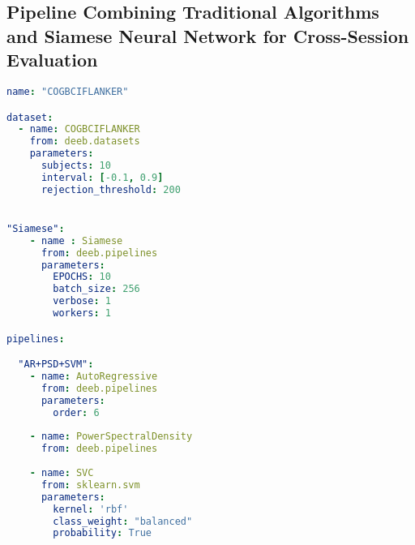 \subsection{Pipeline Combining Traditional Algorithms and Siamese Neural Network for Cross-Session Evaluation}
\begin{lstlisting}[language=YAML, style=customyaml, caption={Benchamrking pipeline for multi-session dataset COGBCIFLANKER with traditional and deep learning methods}, label={lst:yaml}]
name: "COGBCIFLANKER"

dataset: 
  - name: COGBCIFLANKER
    from: deeb.datasets
    parameters: 
      subjects: 10
      interval: [-0.1, 0.9]
      rejection_threshold: 200


"Siamese": 
    - name : Siamese
      from: deeb.pipelines
      parameters: 
        EPOCHS: 10
        batch_size: 256
        verbose: 1
        workers: 1

pipelines:

  "AR+PSD+SVM": 
    - name: AutoRegressive
      from: deeb.pipelines
      parameters: 
        order: 6
        
    - name: PowerSpectralDensity
      from: deeb.pipelines
        
    - name: SVC
      from: sklearn.svm
      parameters: 
        kernel: 'rbf'
        class_weight: "balanced"
        probability: True
        
\end{lstlisting}


